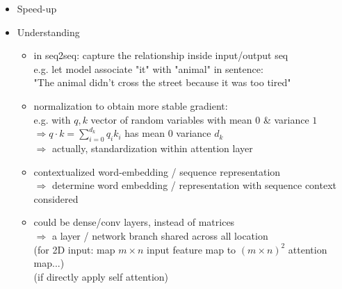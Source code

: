 \begin{itemize}
\begin{itemize}
	\item Speed-up
	\item Understanding
		\begin{itemize}
		\item in seq2seq: capture the relationship inside input/output seq \\
		e.g. let model associate "it" with "animal" in sentence: \\
		"The animal didn't cross the street because it was too tired"
		\item normalization to obtain more stable gradient: \\
		e.g. with $q,k$ vector of random variables with mean $0$ \& variance $1$ \\
		$\Rightarrow q\cdot k = \sum_{i=0}^{d_k} q_ik_i$ has mean $0$ variance $d_k$ \\
		$\Rightarrow$ actually, standardization within attention layer
		\item contextualized word-embedding / sequence representation \\
		$\Rightarrow$ determine word embedding / representation with sequence context considered
		\item could be dense/conv layers, instead of matrices \\ 
		$\Rightarrow$ a layer / network branch shared across all location \\
		(for 2D input: map $m\times n$ input feature map to $(m\times n)^2$ attention map...) \\
		(if directly apply self attention)
		\end{itemize}
	\end{itemize}


\end{itemize}
